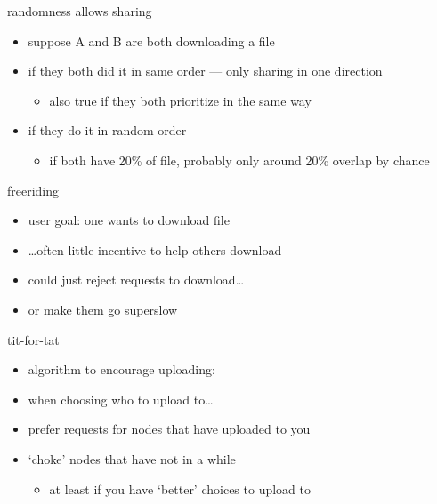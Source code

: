 \begin{frame}{randomness allows sharing}
    \begin{itemize}
    \item suppose A and B are both downloading a file
    \item if they both did it in same order --- only sharing in one direction
        \begin{itemize}
        \item also true if they both prioritize in the same way
        \end{itemize}
    \item if they do it in random order
        \begin{itemize}
        \item if both have 20\% of file, probably only around 20\% overlap by chance
        \end{itemize}
    \end{itemize}
\end{frame}

\begin{frame}{freeriding}
    \begin{itemize}
    \item user goal: one wants to download file
    \item \ldots often little incentive to help others download
    \vspace{.5cm}
    \item could just reject requests to download\ldots
    \item or make them go superslow
    \end{itemize}
\end{frame}

\begin{frame}{tit-for-tat}
    \begin{itemize}
    \item algorithm to encourage uploading:
    \vspace{.5cm}
    \item when choosing who to upload to\ldots
    \item prefer requests for nodes that have uploaded to you
    \item `choke' nodes that have not in a while
        \begin{itemize}
        \item at least if you have `better' choices to upload to
        \end{itemize}
    \end{itemize}
\end{frame}


